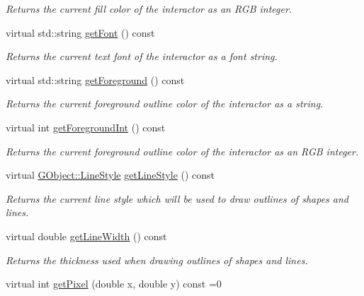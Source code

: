 \begin{DoxyCompactItemize}
\begin{DoxyCompactList}\small\item\em Returns the current fill color of the interactor as an R\+GB integer. \end{DoxyCompactList}\item 
virtual std\+::string \mbox{\hyperlink{classsgl_1_1GDrawingSurface_a894a5502900794eeb27d084c21f1d77d}{get\+Font}} () const
\begin{DoxyCompactList}\small\item\em Returns the current text font of the interactor as a font string. \end{DoxyCompactList}\item 
virtual std\+::string \mbox{\hyperlink{classsgl_1_1GDrawingSurface_a4fa2d8b0192a3a5b4af4bbfe71194d03}{get\+Foreground}} () const
\begin{DoxyCompactList}\small\item\em Returns the current foreground outline color of the interactor as a string. \end{DoxyCompactList}\item 
virtual int \mbox{\hyperlink{classsgl_1_1GDrawingSurface_ac3b12ab385a6ef9ae90fc879860ba726}{get\+Foreground\+Int}} () const
\begin{DoxyCompactList}\small\item\em Returns the current foreground outline color of the interactor as an R\+GB integer. \end{DoxyCompactList}\item 
virtual \mbox{\hyperlink{classsgl_1_1GObject_a86e0f5648542856159bb40775c854aa7}{G\+Object\+::\+Line\+Style}} \mbox{\hyperlink{classsgl_1_1GDrawingSurface_aaf1f5ea8281e5e3486662878d26f0a13}{get\+Line\+Style}} () const
\begin{DoxyCompactList}\small\item\em Returns the current line style which will be used to draw outlines of shapes and lines. \end{DoxyCompactList}\item 
virtual double \mbox{\hyperlink{classsgl_1_1GDrawingSurface_a85ff266dc3eb63d9f2d8e5a4487fd3c0}{get\+Line\+Width}} () const
\begin{DoxyCompactList}\small\item\em Returns the thickness used when drawing outlines of shapes and lines. \end{DoxyCompactList}\item 
virtual int \mbox{\hyperlink{classsgl_1_1GDrawingSurface_a40f3e3f64a8263e13b7162e15b2979ee}{get\+Pixel}} (double x, double y) const =0

\end{DoxyCompactItemize}

